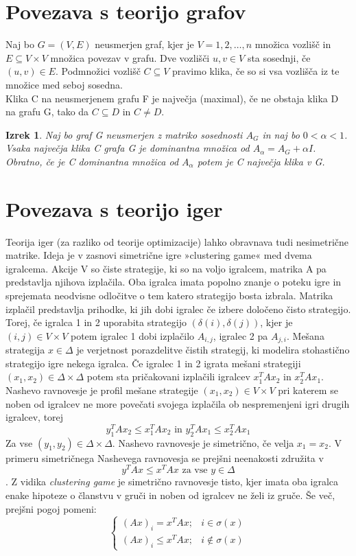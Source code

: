\documentclass[a4paper]{article}
\newtheorem{theorem}{Izrek}
\begin{document}
\section{Povezava s teorijo grafov}
Naj bo $G=(V,E)$ neusmerjen graf, kjer je $V={1,2,\ldots,n}$ množica vozlišč in $E\subseteq V\times V$ množica povezav v grafu. Dve vozlišči $u, v \in V$ sta sosednji, če $(u, v) \in E$. Podmnožici vozlišč $C \subseteq V$ pravimo klika, če so si vsa vozlišča iz te množice med seboj sosedna.\\
Klika C na neusmerjenem grafu F je največja (maximal), če ne obstaja klika D na grafu G, tako da $C \subseteq D$ in $C \not= D$.
\begin{theorem}
Naj bo graf G neusmerjen z matriko sosednosti $A_G$ in naj bo $0 < \alpha < 1$. Vsaka največja klika C grafa G je dominantna množica od $A_\alpha = A_G + \alpha I$. Obratno, če je C dominantna množica od $A_\alpha$ potem je C največja klika v G.
\end{theorem}

\section{Povezava s teorijo iger}
Teorija iger (za razliko od teorije optimizacije) lahko obravnava tudi nesimetrične matrike. Ideja je v zasnovi simetrične igre »clustering game« med dvema igralcema. Akcije V so čiste strategije, ki so na voljo igralcem, matrika A pa predstavlja njihova izplačila. Oba igralca imata popolno znanje o poteku igre in sprejemata neodvisne odločitve o tem katero strategijo bosta izbrala. Matrika izplačil predstavlja prihodke, ki jih dobi igralec če izbere določeno čisto strategijo. Torej, če igralca 1 in 2 uporabita strategijo $(\delta(i),\delta(j))$, kjer je $(i,j)\in V\times V$ potem igralec 1 dobi izplačilo $A_{i,j}$, igralec 2 pa $A_{j,i}$.
Mešana strategija $x\in\Delta$ je verjetnost porazdelitve čistih strategij, ki modelira stohastično strategijo igre nekega igralca. Če igralec 1 in 2 igrata mešani strategiji $(x_1,x_2)\in\Delta\times\Delta$  potem sta pričakovani izplačili igralcev $x_1^TAx_2$ in $x_2^TAx_1$.
Nashevo ravnovesje je profil mešane strategije $(x_1,x_2)\in V\times V$ pri katerem se noben od igralcev ne more povečati svojega izplačila ob nespremenjeni igri drugih igralcev, torej 
$$y_1^TAx_2\leq x_1^TAx_2 \text{ in } y_2^TAx_1\leq x_2^TAx_1$$
Za vse $(y_1,y_2)\in\Delta\times\Delta$. Nashevo ravnovesje je simetrično, če velja $x_1=x_2$. V primeru simetričnega Nashevega ravnovesja se prejšni neenakosti združita v
$$y^TAx\leq x^TAx \text{ za vse } y\in\Delta$$.
Z vidika \textit{clustering game} je simetrično ravnovesje tisto, kjer imata oba igralca enake hipoteze o članstvu v gruči in noben od igralcev ne želi iz gruče. Še več, prejšni pogoj pomeni:
$$\begin{cases}
(Ax)_i=x^TAx; & i\in\sigma(x) \\ (Ax)_i\leq x^TAx; & i\not\in\sigma(x)
\end{cases}$$
\end{document}
